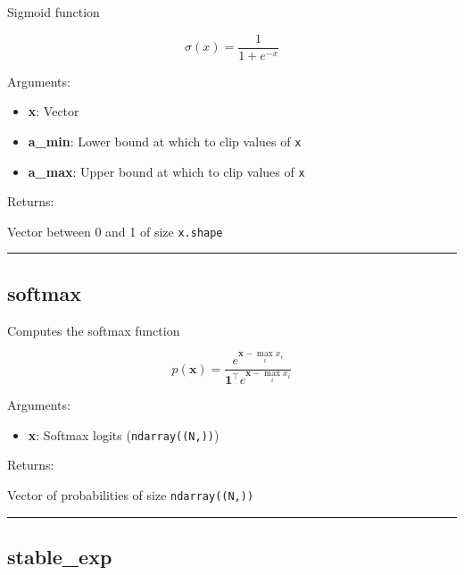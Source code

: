 Sigmoid function

\[
\sigma(x) = \frac{1}{1 + e^{-x}}
\]

Arguments:

\begin{itemize}
\tightlist
\item
  \textbf{x}: Vector
\item
  \textbf{a\_min}: Lower bound at which to clip values of \texttt{x}
\item
  \textbf{a\_max}: Upper bound at which to clip values of \texttt{x}
\end{itemize}

Returns:

Vector between 0 and 1 of size \texttt{x.shape}

\begin{center}\rule{0.5\linewidth}{\linethickness}\end{center}

\subsection{softmax}\label{softmax}

\begin{Shaded}
\begin{Highlighting}[]
\end{Highlighting}
\end{Shaded}

Computes the softmax function

\[
p(\mathbf{x}) = \frac{e^{\mathbf{x} - \max_i x_i}}{\mathbf{1}^\top e^{\mathbf{x} - \max_i x_i}}
\]

Arguments:

\begin{itemize}
\tightlist
\item
  \textbf{x}: Softmax logits (\texttt{ndarray((N,))})
\end{itemize}

Returns:

Vector of probabilities of size \texttt{ndarray((N,))}

\begin{center}\rule{0.5\linewidth}{\linethickness}\end{center}

\subsection{stable\_exp}\label{stable_exp}

